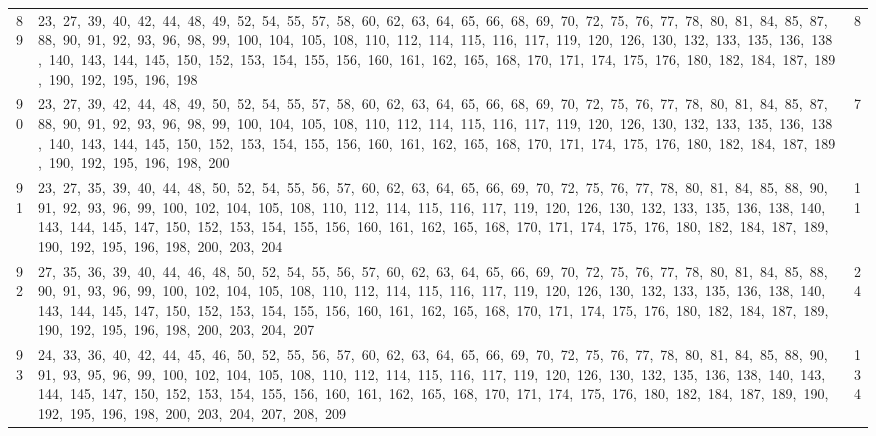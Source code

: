 \begin{longtable}{c|p{}|r}
89 & 23,\ 27,\ 39,\ 40,\ 42,\ 44,\ 48,\ 49,\ 52,\ 54,\ 55,\ 57,\ 58,\ 60,\ 62,\ 63,\ 64,\ 65,\ 66,\ 68,\ 69,\ 70,\ 72,\ 75,\ 76,\ 77,\ 78,\ 80,\ 81,\ 84,\ 85,\ 87,\ 88,\ 90,\ 91,\ 92,\ 93,\ 96,\ 98,\ 99,\ 100,\ 104,\ 105,\ 108,\ 110,\ 112,\ 114,\ 115,\ 116,\ 117,\ 119,\ 120,\ 126,\ 130,\ 132,\ 133,\ 135,\ 136,\ 138,\ 140,\ 143,\ 144,\ 145,\ 150,\ 152,\ 153,\ 154,\ 155,\ 156,\ 160,\ 161,\ 162,\ 165,\ 168,\ 170,\ 171,\ 174,\ 175,\ 176,\ 180,\ 182,\ 184,\ 187,\ 189,\ 190,\ 192,\ 195,\ 196,\ 198 & 8 \\
90 & 23,\ 27,\ 39,\ 42,\ 44,\ 48,\ 49,\ 50,\ 52,\ 54,\ 55,\ 57,\ 58,\ 60,\ 62,\ 63,\ 64,\ 65,\ 66,\ 68,\ 69,\ 70,\ 72,\ 75,\ 76,\ 77,\ 78,\ 80,\ 81,\ 84,\ 85,\ 87,\ 88,\ 90,\ 91,\ 92,\ 93,\ 96,\ 98,\ 99,\ 100,\ 104,\ 105,\ 108,\ 110,\ 112,\ 114,\ 115,\ 116,\ 117,\ 119,\ 120,\ 126,\ 130,\ 132,\ 133,\ 135,\ 136,\ 138,\ 140,\ 143,\ 144,\ 145,\ 150,\ 152,\ 153,\ 154,\ 155,\ 156,\ 160,\ 161,\ 162,\ 165,\ 168,\ 170,\ 171,\ 174,\ 175,\ 176,\ 180,\ 182,\ 184,\ 187,\ 189,\ 190,\ 192,\ 195,\ 196,\ 198,\ 200 & 7 \\
91 & 23,\ 27,\ 35,\ 39,\ 40,\ 44,\ 48,\ 50,\ 52,\ 54,\ 55,\ 56,\ 57,\ 60,\ 62,\ 63,\ 64,\ 65,\ 66,\ 69,\ 70,\ 72,\ 75,\ 76,\ 77,\ 78,\ 80,\ 81,\ 84,\ 85,\ 88,\ 90,\ 91,\ 92,\ 93,\ 96,\ 99,\ 100,\ 102,\ 104,\ 105,\ 108,\ 110,\ 112,\ 114,\ 115,\ 116,\ 117,\ 119,\ 120,\ 126,\ 130,\ 132,\ 133,\ 135,\ 136,\ 138,\ 140,\ 143,\ 144,\ 145,\ 147,\ 150,\ 152,\ 153,\ 154,\ 155,\ 156,\ 160,\ 161,\ 162,\ 165,\ 168,\ 170,\ 171,\ 174,\ 175,\ 176,\ 180,\ 182,\ 184,\ 187,\ 189,\ 190,\ 192,\ 195,\ 196,\ 198,\ 200,\ 203,\ 204 & 11 \\
92 & 27,\ 35,\ 36,\ 39,\ 40,\ 44,\ 46,\ 48,\ 50,\ 52,\ 54,\ 55,\ 56,\ 57,\ 60,\ 62,\ 63,\ 64,\ 65,\ 66,\ 69,\ 70,\ 72,\ 75,\ 76,\ 77,\ 78,\ 80,\ 81,\ 84,\ 85,\ 88,\ 90,\ 91,\ 93,\ 96,\ 99,\ 100,\ 102,\ 104,\ 105,\ 108,\ 110,\ 112,\ 114,\ 115,\ 116,\ 117,\ 119,\ 120,\ 126,\ 130,\ 132,\ 133,\ 135,\ 136,\ 138,\ 140,\ 143,\ 144,\ 145,\ 147,\ 150,\ 152,\ 153,\ 154,\ 155,\ 156,\ 160,\ 161,\ 162,\ 165,\ 168,\ 170,\ 171,\ 174,\ 175,\ 176,\ 180,\ 182,\ 184,\ 187,\ 189,\ 190,\ 192,\ 195,\ 196,\ 198,\ 200,\ 203,\ 204,\ 207 & 24 \\
93 & 24,\ 33,\ 36,\ 40,\ 42,\ 44,\ 45,\ 46,\ 50,\ 52,\ 55,\ 56,\ 57,\ 60,\ 62,\ 63,\ 64,\ 65,\ 66,\ 69,\ 70,\ 72,\ 75,\ 76,\ 77,\ 78,\ 80,\ 81,\ 84,\ 85,\ 88,\ 90,\ 91,\ 93,\ 95,\ 96,\ 99,\ 100,\ 102,\ 104,\ 105,\ 108,\ 110,\ 112,\ 114,\ 115,\ 116,\ 117,\ 119,\ 120,\ 126,\ 130,\ 132,\ 135,\ 136,\ 138,\ 140,\ 143,\ 144,\ 145,\ 147,\ 150,\ 152,\ 153,\ 154,\ 155,\ 156,\ 160,\ 161,\ 162,\ 165,\ 168,\ 170,\ 171,\ 174,\ 175,\ 176,\ 180,\ 182,\ 184,\ 187,\ 189,\ 190,\ 192,\ 195,\ 196,\ 198,\ 200,\ 203,\ 204,\ 207,\ 208,\ 209 & 134 \\

\end{longtable}
